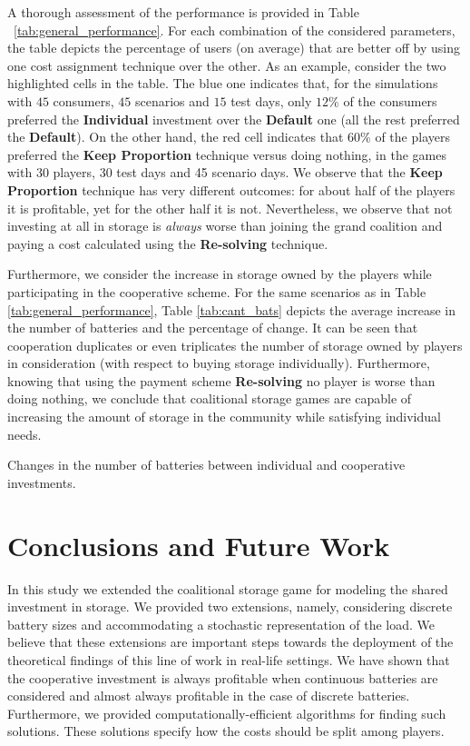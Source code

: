 A thorough assessment of the performance is provided in Table ~\ref{tab:general_performance}. For each combination of the considered parameters, the table depicts the percentage of users (on average) that are better off by using one cost assignment technique over the other.
As an example, consider the two highlighted cells in the table. The blue one indicates that, for the simulations with $45$ consumers, $45$ scenarios and $15$ test days, only $12\%$ of the consumers preferred the \textbf{Individual} investment over the \textbf{Default} one (all the rest preferred the \textbf{Default}). On the other hand, the red cell indicates that $60\%$ of the players preferred the \textbf{Keep Proportion} technique versus doing nothing, in the games with $30$ players, 30 test days and 45 scenario days.
We observe that the \textbf{Keep Proportion} technique has very different outcomes: for about half of the players it is profitable, yet for the other half it is not.  Nevertheless, we observe that not investing at all in storage is \emph{always} worse than joining the grand coalition and paying a cost calculated using the \textbf{Re-solving} technique.



Furthermore, we consider the increase in storage owned by the players while participating in the cooperative scheme. For the same scenarios as in Table \ref{tab:general_performance}, Table \ref{tab:cant_bats} depicts the average increase in the number of batteries and the percentage of change. It can be seen that cooperation duplicates or even triplicates the number of storage owned by players in consideration (with respect to buying storage individually). Furthermore, knowing that using the payment scheme \textbf{Re-solving} no player is worse than doing nothing, we conclude that coalitional storage games are capable of increasing the amount of storage in the community while satisfying individual needs.

\begin{table}
  
  \caption{Changes in the number of batteries between individual and cooperative investments.}
  \label{tab:cant_bats}
\end{table}


\section{Conclusions and Future Work}

In this study we extended the coalitional storage game for modeling the shared investment in storage. We provided two extensions, namely, considering discrete battery sizes and accommodating a stochastic representation of the load. We believe that these extensions are important steps towards the deployment of the theoretical findings of this line of work in real-life settings.
We have shown that the cooperative investment is always profitable when continuous batteries are considered and almost always profitable in the case of discrete batteries.
Furthermore, we provided computationally-efficient algorithms for finding such solutions. These solutions specify how the costs should be split among players.

